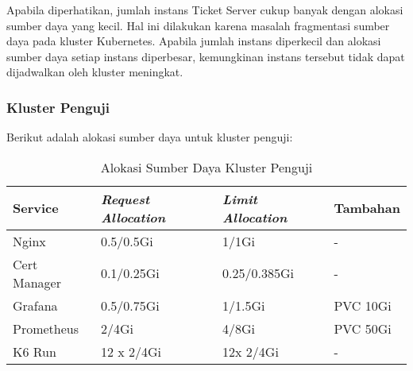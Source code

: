 Apabila diperhatikan, jumlah instans Ticket Server cukup banyak dengan alokasi sumber daya yang kecil. Hal ini dilakukan karena masalah fragmentasi sumber daya pada kluster Kubernetes. Apabila jumlah instans diperkecil dan alokasi sumber daya setiap instans diperbesar, kemungkinan instans tersebut tidak dapat dijadwalkan oleh kluster meningkat.

\subsubsection{Kluster Penguji}

Berikut adalah alokasi sumber daya untuk kluster penguji:

\begin{table}[htbp]
    \centering
    \caption{Alokasi Sumber Daya Kluster Penguji}
    \label{tab:test-cluster-allocation}
    \begin{tabular}{|l|l|l|l|}
        \hline
        \textbf{Service} & \textbf{\textit{Request Allocation}} & \textbf{\textit{Limit Allocation}} & \textbf{Tambahan} \\ \hline
        Nginx            & 0.5/0.5Gi                    & 1/1Gi                      & -              \\ \hline
        Cert Manager     & 0.1/0.25Gi                   & 0.25/0.385Gi               & -              \\ \hline
        Grafana          & 0.5/0.75Gi                   & 1/1.5Gi                    & PVC 10Gi       \\ \hline
        Prometheus       & 2/4Gi                        & 4/8Gi                      & PVC 50Gi       \\ \hline
        K6 Run           & 12 x 2/4Gi                   & 12x 2/4Gi                  & -              \\ \hline
    \end{tabular}
\end{table}

